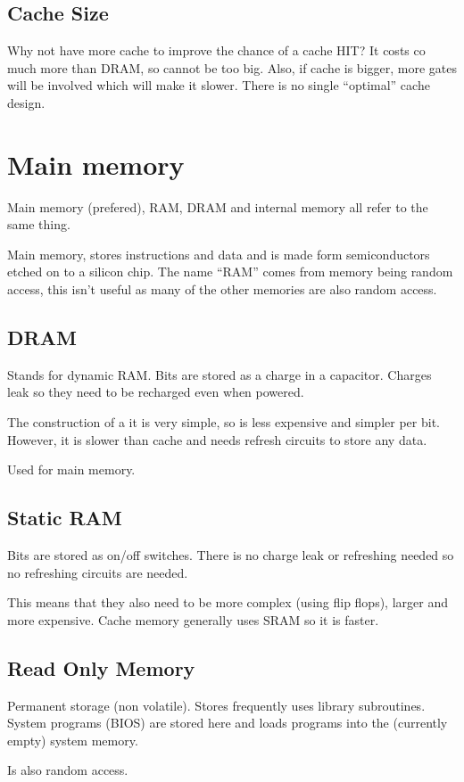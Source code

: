 \subsection{Cache Size}\label{sub:cache_size}

Why not have more cache to improve the chance of a cache HIT?
It costs co much more than DRAM, so cannot be too big.
Also, if cache is bigger, more gates will be involved which will make it slower.
There is no single ``optimal'' cache design.

\section{Main memory}\label{sec:main_memory}

Main memory (prefered), RAM, DRAM and internal memory all refer to the same thing.

Main memory, stores instructions and data and is made form semiconductors etched on to a silicon chip.
The name ``RAM'' comes from memory being random access, this isn't useful as many of the other memories are also random access.

\subsection{DRAM}\label{sub:dram}

Stands for dynamic RAM.
Bits are stored as a charge in a capacitor.
Charges leak so they need to be recharged even when powered.

The construction of a it is very simple, so is less expensive and simpler per bit. However, it is slower than cache and needs refresh circuits to store any data.

Used for main memory.

\subsection{Static RAM}\label{sub:static_ram}

Bits are stored as on/off switches.
There is no charge leak or refreshing needed so no refreshing circuits are needed.

This means that they also need to be more complex (using flip flops), larger and more expensive.
Cache memory generally uses SRAM so it is faster.

\subsection{Read Only Memory}\label{sub:read_only_memory}

Permanent storage (non volatile).
Stores frequently uses library subroutines.
System programs (BIOS) are stored here and loads programs into the (currently empty) system memory.

Is also random access.

